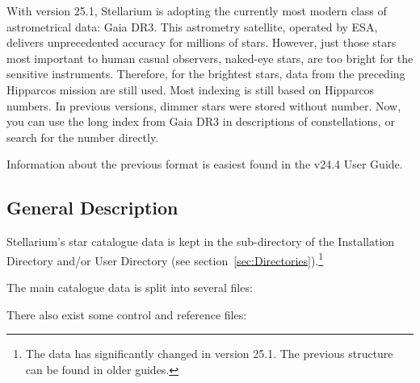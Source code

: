 With version 25.1, Stellarium is adopting the currently most modern class of astrometrical data: Gaia DR3. 
This astrometry satellite, operated by ESA, delivers unprecedented accuracy for millions of stars. 
However, just those stars most important to human casual observers, naked-eye stars, 
are too bright for the sensitive instruments. Therefore, for the brightest stars, 
data from the preceding Hipparcos mission are still used. Most indexing is still based on Hipparcos numbers. 
In previous versions, dimmer stars were stored without number. Now, you can use the long index from Gaia DR3 
in descriptions of constellations, or search for the number directly. 

Information about the previous format is easiest found in the v24.4 User Guide.
 

\subsection{General Description}%
\label{sec:Catalogues:stars:general}

Stellarium's star catalogue data is kept in the 
sub-directory of the Installation Directory and/or User Directory (see
section~\ref{sec:Directories}).\footnote{The data has significantly changed in version 25.1. The previous structure can be found in older guides.}

The main catalogue data is split into several files:

\begin{description}
\item[]
\item[]
\item[]
\item[]
\item[]
\item[]
\item[]
\item[]
\item[]
\end{description}

There also exist some control and reference files:

\begin{description}
\item[]
\item[]
\item[]
\item[]
\item[]
\item[]
\item[]
\item[]
\end{description}

